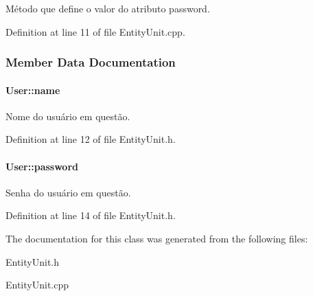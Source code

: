 Método que define o valor do atributo password. 



Definition at line 11 of file Entity\-Unit.\-cpp.



\subsubsection{Member Data Documentation}
\hypertarget{classUser_a578e38a0fc23375ce19d689f96c6abaa}{
\paragraph[{name}]{ User\-::name\hspace{0.3cm}{\ttfamily [protected]}}}\label{d9/dc0/classUser_a578e38a0fc23375ce19d689f96c6abaa}


Nome do usuário em questão. 



Definition at line 12 of file Entity\-Unit.\-h.

\hypertarget{classUser_a84c5ed822199a90e753ebfc54262fde8}{
\paragraph[{password}]{ User\-::password\hspace{0.3cm}{\ttfamily [protected]}}}\label{d9/dc0/classUser_a84c5ed822199a90e753ebfc54262fde8}


Senha do usuário em questão. 



Definition at line 14 of file Entity\-Unit.\-h.



The documentation for this class was generated from the following files\-:\begin{DoxyCompactItemize}
\item 
Entity\-Unit.\-h\item 
Entity\-Unit.\-cpp\end{DoxyCompactItemize}
